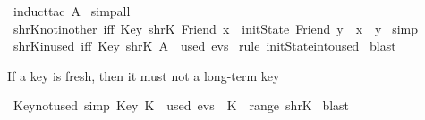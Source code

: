 \begin{isabellebody}
  \isatagproof
  \isamarkupfalse%
  \ {\isacharparenleft}induct{\isacharunderscore}tac\ {\isachardoublequoteopen}A{\isachardoublequoteclose}{\isacharparenright}\isanewline
  \isamarkupfalse%
  \ simp{\isacharunderscore}all\isanewline
  \isamarkupfalse%
  \endisatagproof
  {\isafoldproof}%
  \isadelimproof
  \isanewline
  \endisadelimproof
  \isanewline
  \isanewline
  \isamarkupfalse%
  \ shrK{\isacharunderscore}not{\isacharunderscore}in{\isacharunderscore}other\ {\isacharbrackleft}iff{\isacharbrackright}{\isacharcolon}\ {\isachardoublequoteopen}Key\ {\isacharparenleft}shrK\ {\isacharparenleft}Friend\ x{\isacharparenright}{\isacharparenright}\ {\isasymin}\ initState\ {\isacharparenleft}Friend\ y{\isacharparenright}\ {\isasymLongrightarrow}\ {\isacharparenleft}x\ {\isacharequal}\ y{\isacharparenright}{\isachardoublequoteclose}\isanewline
  \isadelimproof
  \endisadelimproof
  \isatagproof
  \isamarkupfalse%
  \ simp\isanewline
  \isamarkupfalse%
  \endisatagproof
  {\isafoldproof}%
  \isadelimproof
  \isanewline
  \endisadelimproof
  \isanewline
  \isanewline
  \isamarkupfalse%
  \ shrK{\isacharunderscore}in{\isacharunderscore}used\ {\isacharbrackleft}iff{\isacharbrackright}{\isacharcolon}\ {\isachardoublequoteopen}Key\ {\isacharparenleft}shrK\ A{\isacharparenright}\ {\isasymin}\ used\ evs{\isachardoublequoteclose}\isanewline
  \isadelimproof
  \endisadelimproof
  \isatagproof
  \isamarkupfalse%
  \ {\isacharparenleft}rule\ initState{\isacharunderscore}into{\isacharunderscore}used{\isacharparenright}\isanewline
  \isamarkupfalse%
  \ blast\isanewline
  \isamarkupfalse%
  \endisatagproof
  {\isafoldproof}%
  \isadelimproof
  \endisadelimproof
  \begin{isamarkuptext}%
  If a key is fresh, then it must not a long-term key%
  \end{isamarkuptext}\isamarkuptrue%
  \isamarkupfalse%
  \ Key{\isacharunderscore}not{\isacharunderscore}used\ {\isacharbrackleft}simp{\isacharbrackright}{\isacharcolon}\ {\isachardoublequoteopen}Key\ K\ {\isasymnotin}\ used\ evs\ {\isasymLongrightarrow}\ K\ {\isasymnotin}\ range\ shrK{\isachardoublequoteclose}\isanewline
  \isadelimproof
  \endisadelimproof
  \isatagproof
  \isamarkupfalse%
  \ blast%
  \endisatagproof
  {\isafoldproof}%
  \isadelimproof
  \isanewline
  \endisadelimproof

\end{isabellebody}
